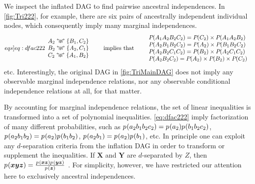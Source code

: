 {We inspect the inflated DAG to find pairwise ancestral independences. In \cref{fig:Tri222}, for example, there are six pairs of ancestrally independent individual nodes, which consequently imply many marginal independences.
\begin{align}\begin{split}\label[eqs]{eq:dfac222}
\larray{
A_2\aindep\{B_1,C_2\}\\
B_2\aindep\{A_2,C_1\}\\
C_2\aindep\{A_1,B_2\}
}\qquad\text{implies that}\qquad
\larray{
\pdf{A_1 A_2 B_2 C_2}=\pdf{C_2}\times\pdf{A_1 A_2 B_2}\\
\pdf{A_2 B_1 B_2 C_2}=\pdf{A_2}\times\pdf{B_1 B_2 C_2}\\
\pdf{A_2 B_2 C_1 C_2}=\pdf{B_2}\times\pdf{A_2 C_1 C_2}\\
\pdf{A_2 B_2 C_2}=\pdf{A_2}\times\pdf{B_2}\times\pdf{C_2}\\
}
\end{split}\end{align}
etc.
Interestingly, the original DAG in \cref{fig:TriMainDAG} does not imply any observable marginal independence relations, nor any observable conditional independence relations at all, for that matter. 

By accounting for marginal independence relations, the set of linear inequalities is transformed into a set of polynomial inequalities. \cref{eq:dfac222} imply factorization of many different probabilities, such as ${{p_{}}\lparen a_2 b_1 b_2 c_2\rparen= {p_{}}\lparen a_2\rparen {p_{}}\lparen b_1 b_2 c_2\rparen}$, ${{p_{}}\lparen a_2 b_1 b_2\rparen= {p_{}}\lparen a_2\rparen {p_{}}\lparen b_1 b_2\rparen}$, ${{p_{}}\lparen a_2 b_1\rparen= {p_{}}\lparen a_2\rparen {p_{}}\lparen b_1\rparen}$, etc. In principle one can exploit any $d$-separation criteria from the inflation DAG in order to transform or supplement the inequalities. If $\bm{X}$ and $\bm{Y}$ are $d$-separated by $Z$, then ${p_{}}\lparen\bm{x} \bm{y} \bm{z}\rparen=\frac{{p_{}}\lparen\bm{x}\bm{z}\rparen{p_{}}\lparen\bm{y}\bm{z}\rparen}{{p_{}}\lparen\bm{z}\rparen}$ \cite{pearl2009causality,spirtes2011causation,studeny2005probabilistic,koller2009probabilistic}. For simplicity, however, we have restricted our attention here to exclusively ancestral independences. 



\label{step:findmap}\par\smallskip\nobreak

}
